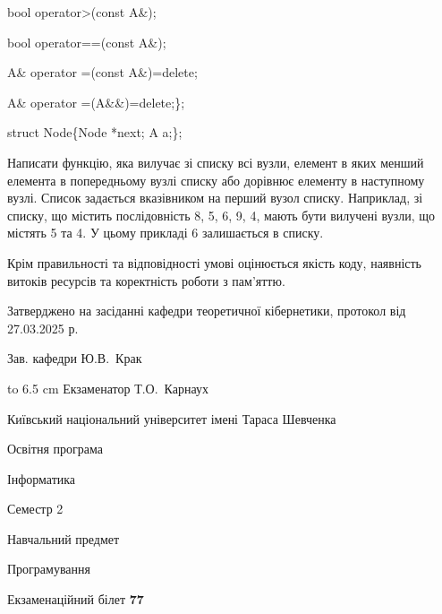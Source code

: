 \documentclass[12pt, ukrainian]{article}
\begin{document}
{\quad  bool operator>(const A\&); 

\quad  bool operator==(const A\&); 

\quad A\& operator =(const A\&)=delete; 

\quad  A\& operator =(A\&\&)=delete;\};

struct Node\{Node *next; A a;\};

 Написати функцію, яка вилучає зі списку всі вузли, елемент в яких менший елемента в попередньому вузлі списку або дорівнює елементу в наступному вузлі. Список задається вказівником на перший вузол списку. Наприклад, зі списку, що містить послідовність 8, 5, 6, 9, 4, мають бути вилучені вузли, що містять 5 та 4. У цьому прикладі 6 залишається в списку.

Крім правильності та відповідності умові оцінюється якість коду, наявність витоків ресурсів та коректність роботи з пам'яттю. 

}
{\smallskip\smallskip \begin {scriptsize} Затверджено на засіданні кафедри теоретичної кібернетики, протокол   від   27.03.2025 р.\par\smallskip\smallskip\smallskip\smallskip
{\parbox {6.5 cm} {Зав. кафедри \dotfill Ю.В.~Крак}}\hspace {0.7cm} {\hbox to 6.5 cm { Екзаменатор \dotfill Т.О.~Карнаух}} \end{scriptsize}}
\newpage
{{\begin {scriptsize}\par
{ \center  Київський національний університет імені Тараса Шевченка \par}
{\parbox {5 cm}{Освітня програма \hfill}{\parbox {7 cm}{Інформатика\hfill}}\parbox {6 cm}{\hfill Семестр 2}}\par
{\parbox {5 cm} {Навчальний предмет \hfill}\parbox {7 cm}{Програмування \hfill}\parbox {6cm}{\hfill}\par}\vspace{-15pt} \end{scriptsize}}{\center Екзаменаційний білет \No \textbf { 77 }\par}}
\end{document}
